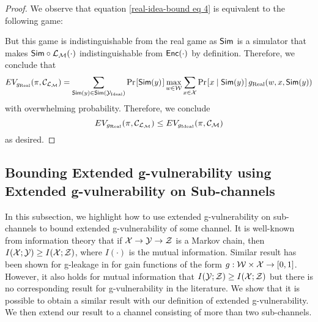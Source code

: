 \begin{proof}
	We observe that equation \ref{real-idea-bound eq 4} is equivalent to the following game:
	\begin{pchstack}[center]
	\end{pchstack}
	But this game is indistinguishable from the real game as $\mathsf{Sim}$ is a simulator that makes $\mathsf{Sim} \circ \mathcal{L}_\mathcal{M}(\cdot)$ indistinguishable from $\mathsf{Enc}(\cdot)$ by definition. Therefore, we conclude that
	\begin{equation}
		EV_{g_{\text{Real}}}(\pi, \channelm) = \sum_{\simulator(y) \in \simulator(\Y_{\text{Ideal}})}  \prob{\simulator(y)} \max_{w \in \W} \sum_{x \in \X} \prob{x \mid \simulator(y)} g_{\text{Real}}(w, x, \simulator(y))
	\end{equation}
	with overwhelming probability. Therefore, we conclude
	\begin{equation}
		EV_{g_{\text{Real}}}(\pi, \mathcal{C}_{\mathcal{L}_\mathcal{M}}) \leq EV_{g_{\text{Ideal}}}(\pi, \mathcal{C}_\mathcal{M})
	\end{equation}
	as desired.
\end{proof}




\subsection{Bounding Extended g-vulnerability using Extended g-vulnerability on Sub-channels}
In this subsection, we highlight how to use extended g-vulnerability on sub-channels to bound extended g-vulnerability of some channel. It is well-known from information theory that if $\mathcal{X} \rightarrow \mathcal{Y} \rightarrow \mathcal{Z}$ is a Markov chain, then $I(\mathcal{X};\mathcal{Y}) \geq I(\mathcal{X};\mathcal{Z})$, where $I(\cdot)$ is the mutual information. Similar result has been shown for g-leakage in \cite{6266165, 10.1007/978-3-642-54792-8_5, 7536368} for gain functions of the form $g: \mathcal{W} \times \mathcal{X} \rightarrow [0,1]$. However, it also holds for mutual information that $I(\mathcal{Y};\mathcal{Z}) \geq I(\mathcal{X};\mathcal{Z})$ but there is no corresponding result for g-vulnerability in the literature. We show that it is possible to obtain a similar result with our definition of extended g-vulnerability. We then extend our result to a channel consisting of more than two sub-channels.


